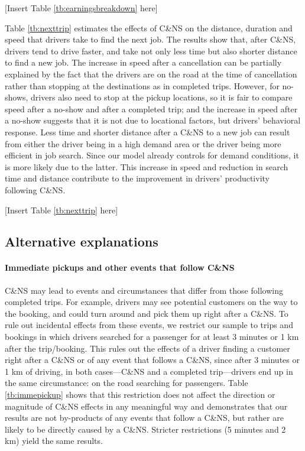 \documentclass[reviewmode,AEJ]{AEA}
\begin{document}
\begin{center}
	[Insert Table \ref{tb:earningsbreakdown} here]
\end{center}

Table \ref{tb:nexttrip} estimates the effects of C\&NS on the distance, duration and speed that drivers 
take to find the next job. The results show that, after C\&NS, drivers tend to drive faster, and take not
only less time but also shorter distance to find a new job. The increase in speed after a cancellation can
be partially explained by the fact that the drivers are on the road at the time of cancellation rather than 
stopping at the destinations as in completed trips. However, for no-shows, drivers also need to stop at the
pickup locations, so it is fair to compare speed after a no-show and after a completed trip; and the increase
in speed after a no-show suggests that it is not due to locational factors, but drivers' behavioral response.
Less time and shorter distance after a C\&NS to a new job can result from either the driver being in a high
demand area or the driver being more efficient in job search. Since our model already controls for demand 
conditions, it is more likely due to the latter. This increase in speed and reduction in search time and 
distance contribute to the improvement in drivers' productivity following C\&NS.

\begin{center}
	[Insert Table \ref{tb:nexttrip} here]
\end{center}

\subsection{Alternative explanations}

\paragraph{Immediate pickups and other events that follow C\&NS} C\&NS may lead to events and circumstances 
that differ from those following completed trips. For example, drivers may see potential customers on the way
to the booking, and could turn around and pick them up right after a C\&NS. 
To rule out incidental effects from these events, we restrict our sample to trips and bookings in which 
drivers searched for a passenger for at least 3 minutes or 1 km after the trip/booking. This rules out the
effects of a driver finding a customer right after a C\&NS or of any event that follows a C\&NS, since after
3 minutes or 1 km of driving, in both cases---C\&NS and a completed trip---drivers end up in the same 
circumstance: on the road searching for passengers. Table \ref{tb:immepickup} shows that this restriction 
does not affect the direction or magnitude of C\&NS effects in any meaningful way and demonstrates that our
results are not by-products of any events that follow a C\&NS, but rather are likely to be directly caused 
by a C\&NS. Stricter restrictions (5 minutes and 2 km) yield the same results.
\end{document}

